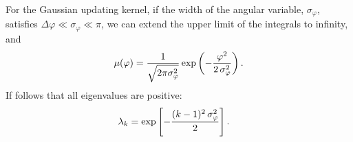 \documentclass[reprint, superscriptaddress, floatfix]{revtex4-1}
\begin{document}
For the Gaussian updating kernel,
if the width of the angular variable, $\sigma_\varphi$,
satisfies $\Delta \varphi \ll \sigma_\varphi \ll \pi$,
we can extend
the upper limit of the integrals
to infinity, and
%
\begin{equation}
  \mu(\varphi)
  =
  \frac{            1            }
       { \sqrt{ 2 \pi \sigma_\varphi^2 } }
  \exp\left(
        -\frac{   \varphi^2   }
              { 2 \, \sigma_\varphi^2 }
      \right)
  .
\notag
\end{equation}
%
%
If follows that all eigenvalues are positive\cite{bussi2006}:
%
\begin{align}
  \lambda_k
  &=
  \exp\left[
        -\frac{ (k - 1)^2 \, \sigma_\varphi^2 }
              {           2           }
      \right]
  .
\notag
\end{align}



\end{document}
